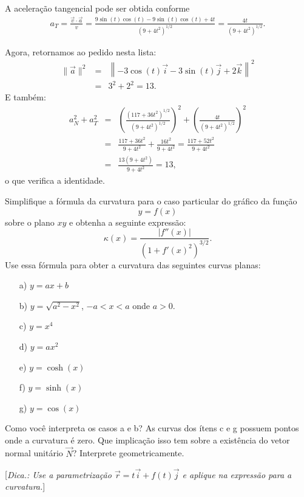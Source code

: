 \begin{resol}
A aceleração tangencial pode ser obtida conforme
\begin{eqnarray*}a_T=\frac{\vec{v}\cdot \vec{a}}{v}=\frac{9\sin(t)\cos(t) -9\sin(t) \cos(t)+4t}{\left(9+4t^2\right)^{1/2}}=\frac{4t}{\left(9+4t^2\right)^{1/2}}.
\end{eqnarray*}

Agora, retornamos ao pedido nesta lista:
\begin{eqnarray*}
 \|\vec{a}\|^2&=&\left\|-3\cos (t) \vec{i} - 3\sin (t) \vec{j} +2\vec{k}\right\|^2\\&=&3^2+2^2=13.
\end{eqnarray*}
E também:
\begin{eqnarray*}
a_N^2+a_T^2&=&\left(\frac{\left(117+36t^2\right)^{1/2}}{\left(9+4t^2\right)^{1/2}}\right)^2+\left(\frac{4t}{\left(9+4t^2\right)^{1/2}}\right)^2\\
&=&\frac{117+36t^2}{9+4t^2}+\frac{16t^2}{9+4t^2}=\frac{117+52t^2}{9+4t^2}\\&=&
\frac{13(9+4t^2)}{9+4t^2}=13,
\end{eqnarray*}
o que verifica a identidade.
 
\end{resol}



\begin{exeresol}
Simplifique a fórmula da curvatura para o caso particular do gráfico da função
$$y=f(x)$$
sobre o plano $xy$
e obtenha a seguinte expressão:
$$\kappa(x)=\frac{|f''(x)|}{\left(1+f'(x)^2\right)^{3/2}}.$$
Use essa fórmula para obter a curvatura das seguintes curvas planas:
\begin{itemize}
\item[a)] $y=ax+b$
\item[b)]$y=\sqrt{a^2-x^2}$, $-a<x<a$ onde $a>0$.
\item[c)] $y=x^4$
\item[d)] $y=ax^2$ 
\item[e)] $y=\cosh(x)$
\item[f)] $y=\sinh(x)$
\item[g)] $y=\cos(x)$
\end{itemize}
Como você interpreta os casos a e b? As curvas dos ítens c e g possuem pontos onde a curvatura é zero. Que implicação isso tem sobre a existência do vetor normal unitário $\vec{N}$? Interprete geometricamente.


[{\it Dica.: Use a parametrização $\vec{r}=t\vec{i}+f(t)\vec{j}$ e aplique na expressão para a curvatura.}]
\end{exeresol}


